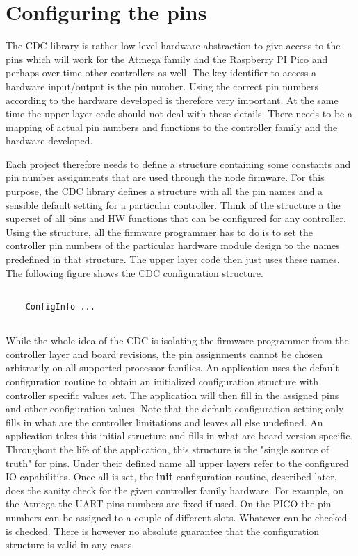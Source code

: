 \section{Configuring the pins}

The CDC library is rather low level hardware abstraction to give access to the pins which will work for the Atmega family and the Raspberry PI Pico and perhaps over time other controllers as well. The key identifier to access a hardware input/output is the pin number. Using the correct pin numbers according to the hardware developed is therefore very important. At the same time the upper layer code should not deal with these details. There needs to be a mapping of actual pin numbers and functions to the controller family and the hardware developed.

Each project therefore needs to define a structure containing some constants and pin number assignments that are used through the node firmware. For this purpose, the CDC library defines a structure with all the pin names and a sensible default setting for a particular controller. Think of the structure a the superset of all pins and HW functions that can be configured for any controller. Using the structure, all the firmware programmer has to do is to set the controller pin numbers of the particular hardware module design to the names predefined in that structure. The upper layer code then just uses these names. The following figure shows the CDC configuration structure.

\lstset{language=c++, style=codesnippetstyle}
\begin{lstlisting}
   
    ConfigInfo ...
    
\end{lstlisting}
\FloatBarrier

While the whole idea of the CDC is isolating the firmware programmer from the controller layer and board revisions, the pin assignments cannot be chosen arbitrarily on all supported processor families. An application uses the default configuration routine to obtain an initialized configuration structure with controller specific values set. The application will then fill in the assigned pins and other configuration values. Note that the default configuration setting only fills in what are the controller limitations and leaves all else undefined. An application takes this initial structure and fills in what are board version specific. Throughout the life of the application, this structure is the "single source of truth" for pins. Under their defined name all upper layers refer to the configured IO capabilities. Once all is set, the \textbf{init} configuration routine, described later, does the sanity check for the given controller family hardware. For example, on the Atmega the UART pins numbers are fixed if used. On the PICO the pin numbers can be assigned to a couple of different slots. Whatever can be checked is checked. There is however no absolute guarantee that the configuration structure is valid in any cases.

